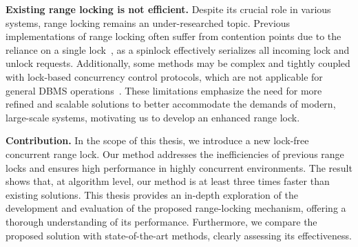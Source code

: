 \newpage

\textbf{Existing range locking is not efficient.}
Despite its crucial role in various systems, range locking remains an under-researched topic. 
Previous implementations of range locking often suffer from contention points due to the reliance on a single lock~\parencite{linuxRangeLockImpl2013, song2013parallelizing}, as a spinlock effectively serializes all incoming lock and unlock requests. 
Additionally, some methods may be complex and tightly coupled with lock-based concurrency control protocols, which are not applicable for general DBMS operations~\parencite{graefe2007hierarchical, andy2022database}. 
These limitations emphasize the need for more refined and scalable solutions to better accommodate the demands of modern, large-scale systems, motivating us to develop an enhanced range lock.

\textbf{Contribution.} In the scope of this thesis, we introduce a new lock-free concurrent range lock. 
Our method addresses the inefficiencies of previous range locks and ensures high performance in highly concurrent environments. 
The result shows that, at algorithm level, our method is at least three times faster than existing solutions. 
This thesis provides an in-depth exploration of the development and evaluation of the proposed range-locking mechanism, offering a thorough understanding of its performance. 
Furthermore, we compare the proposed solution with state-of-the-art methods, clearly assessing its effectiveness.